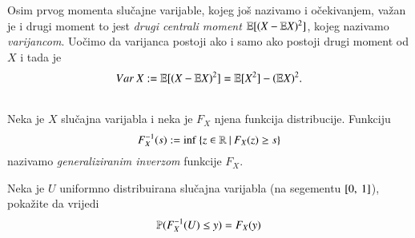Osim prvog momenta slu\v cajne varijable, kojeg jo\v s nazivamo i o\v cekivanjem, va\v zan je i drugi moment to jest \emph{drugi centrali moment} $\mathbb{E} [ (X - \mathbb{E} X)^2 ]$, kojeg nazivamo \emph{varijancom}.
Uo\v cimo da varijanca postoji ako i samo ako postoji drugi moment od $X$ i tada je
\begin{equation*}
    Var \: X := \mathbb{E} [ (X - \mathbb{E} X)^2 ] = \mathbb{E} [ X^2 ] - (\mathbb{E} X)^2.
\end{equation*}

\begin{zad} \label{zad:5.13-1}
    \quad \\
    Neka je $X$ slu\v cajna varijabla i neka je $F_X$ njena funkcija distribucije.
    Funkciju
    \begin{equation*}
        F_X^{-1} (s) := \inf \: \{{z \in \mathbb{R}} \: | \: {F_X (z) \geq s}\}
    \end{equation*}
    nazivamo \emph{generaliziranim inverzom} funkcije $F_X$.
    
    Neka je $U$ uniformno distribuirana slu\v cajna varijabla (na segementu $[{0}, \:{1}]$), poka\v zite da vrijedi
    \begin{equation*}
        \mathbb{P} (F_X^{-1} (U) \leq y ) = F_X (y)
    \end{equation*}
\end{zad}

